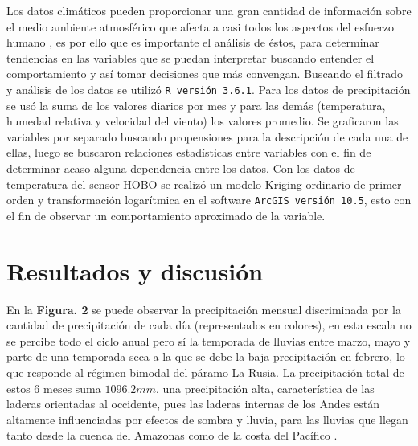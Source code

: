 \documentclass[conference,final,]{IEEEtran}
\begin{document}
Los datos climáticos pueden proporcionar una gran cantidad de
información sobre el medio ambiente atmosférico que afecta a casi todos
los aspectos del esfuerzo humano \citep{Bala}, es por ello que es
importante el análisis de éstos, para determinar tendencias en las
variables que se puedan interpretar buscando entender el comportamiento
y así tomar decisiones que más convengan. Buscando el filtrado y
análisis de los datos se utilizó \texttt{R\ versión\ 3.6.1}. Para los
datos de precipitación se usó la suma de los valores diarios por mes y
para las demás (temperatura, humedad relativa y velocidad del viento)
los valores promedio. Se graficaron las variables por separado buscando
propensiones para la descripción de cada una de ellas, luego se buscaron
relaciones estadísticas entre variables con el fin de determinar acaso
alguna dependencia entre los datos. Con los datos de temperatura del
sensor HOBO se realizó un modelo Kriging ordinario de primer orden y
transformación logarítmica en el software
\texttt{ArcGIS\ versión\ 10.5}, esto con el fin de observar un
comportamiento aproximado de la variable.

\hypertarget{resultados-y-discusiuxf3n}{%
\section{Resultados y discusión}\label{resultados-y-discusiuxf3n}}

En la \textbf{Figura. 2} se puede observar la precipitación mensual
discriminada por la cantidad de precipitación de cada día (representados
en colores), en esta escala no se percibe todo el ciclo anual pero sí la
temporada de lluvias entre marzo, mayo y parte de una temporada seca a
la que se debe la baja precipitación en febrero, lo que responde al
régimen bimodal del páramo La Rusia. La precipitación total de estos 6
meses suma \(1096.2mm\), una precipitación alta, característica de las
laderas orientadas al occidente, pues las laderas internas de los Andes
están altamente influenciadas por efectos de sombra y lluvia, para las
lluvias que llegan tanto desde la cuenca del Amazonas como de la costa
del Pacífico \citep{buytaert2006hidrologia}.
\end{document}
